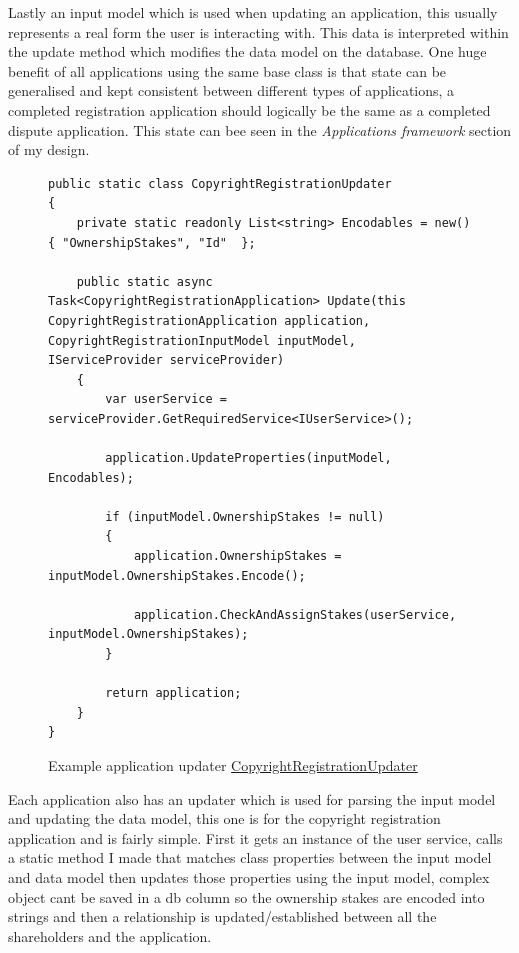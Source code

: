 Lastly an input model which is used when updating an application, this usually represents a real form the user is interacting with. This data is interpreted within the update method which modifies the data model on the database.
\br
One huge benefit of all applications using the same base class is that state can be generalised and kept consistent between different types of applications, a completed registration application should logically be the same as a completed dispute application.
This state can bee seen in the \textit{Applications framework} section of my design.

\begin{figure}[H]
\caption{Example application updater \href{https://github.com/MrHarrisonBarker/CRPL/blob/main/CRPL.Web/Core/Applications/Updaters/CopyrightRegistrationUpdater.cs}{CopyrightRegistrationUpdater}}
\centering
\begin{lstlisting}[language=CSharp]
public static class CopyrightRegistrationUpdater
{
    private static readonly List<string> Encodables = new() { "OwnershipStakes", "Id"  };
    
    public static async Task<CopyrightRegistrationApplication> Update(this CopyrightRegistrationApplication application, CopyrightRegistrationInputModel inputModel, IServiceProvider serviceProvider)
    {
        var userService = serviceProvider.GetRequiredService<IUserService>();
        
        application.UpdateProperties(inputModel, Encodables);

        if (inputModel.OwnershipStakes != null)
        {
            application.OwnershipStakes = inputModel.OwnershipStakes.Encode();

            application.CheckAndAssignStakes(userService, inputModel.OwnershipStakes);
        }

        return application;
    }
}
\end{lstlisting} 
\end{figure}

Each application also has an updater which is used for parsing the input model and updating the data model, this one is for the copyright registration application and is fairly simple. First it gets an instance of the user service, calls a static method I made that matches class properties between the input model and data model then updates those properties using the input model, complex object cant be saved in a db column so the ownership stakes are encoded into strings and then a relationship is updated/established between all the shareholders and the application.

